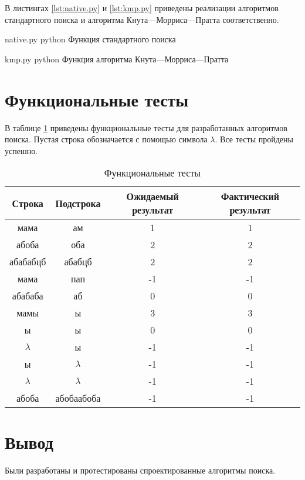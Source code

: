 В листингах \ref{lst:native.py} и \ref{lst:kmp.py} приведены реализации алгоритмов стандартного поиска и алгоритма Кнута---Морриса---Пратта соответственно.

\clearpage
{}
{native.py} %
{python} %
{Функция стандартного поиска} %

\clearpage

{kmp.py} %
{python} %
{Функция алгоритма Кнута---Морриса---Пратта} %

\clearpage

\section{Функциональные тесты}

В таблице \ref{tbl:func_tests} приведены функциональные тесты для разработанных алгоритмов поиска. Пустая строка обозначается с помощью символа $\lambda$. Все тесты пройдены успешно.

\begin{table}[ht]
	\small
	\begin{center}
		\begin{threeparttable}
			\caption{Функциональные тесты}
			\label{tbl:func_tests}
			\begin{tabular}{|c|c|c|c|}
				\hline
				\bfseries Строка
				& \bfseries Подстрока
				& \bfseries Ожидаемый результат
				& \bfseries Фактический результат \\ 
				\hline
				мама & ам & 1 & 1\\
				\hline
				абоба & оба & 2 & 2\\
				\hline
				абабабцб & абабцб & 2 & 2\\
				\hline
				мама & пап & -1 & -1\\
				\hline
				абабаба & аб & 0 & 0\\
				\hline
				мамы & ы & 3 & 3\\
				\hline
				ы & ы & 0 & 0\\
				\hline
				$\lambda$ & ы & -1 & -1\\
				\hline
				ы & $\lambda$ & -1 & -1\\
				\hline
				$\lambda$ & $\lambda$ & -1 & -1\\
				\hline
				абоба & абобаабоба & -1 & -1\\
				\hline
			\end{tabular}	
		\end{threeparttable}	
	\end{center}
\end{table}


\section*{Вывод}
Были разработаны и протестированы спроектированные алгоритмы поиска.